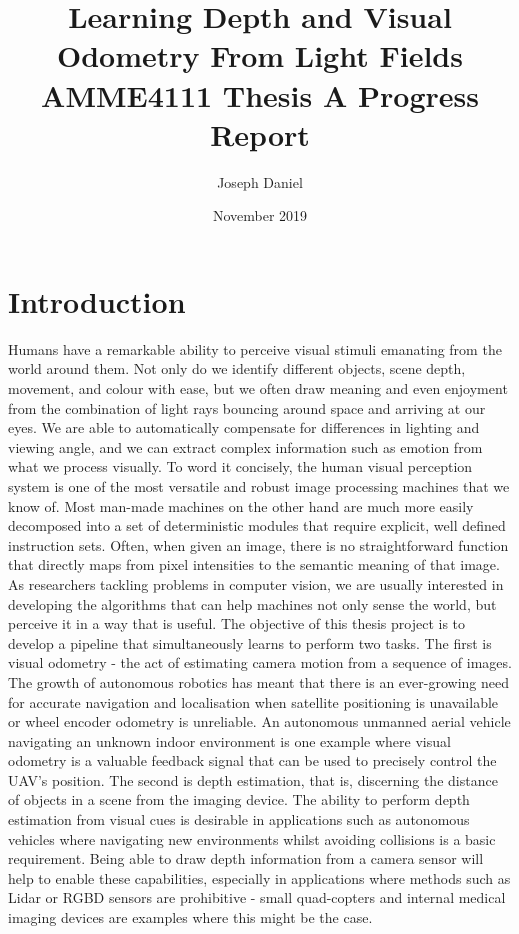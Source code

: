 \documentclass[openany]{book}
\title{Learning Depth and Visual Odometry From Light Fields \\
\large AMME4111 Thesis A Progress Report}
\author{Joseph Daniel}
\date{November 2019}
\begin{document}
\maketitle

\tableofcontents

\chapter{Introduction}
Humans have a remarkable ability to perceive visual stimuli emanating from the world around them. Not only do we identify different objects, scene depth, movement, and colour with ease, but we often draw meaning and even enjoyment from the combination of light rays bouncing around space and arriving at our eyes. We are able to automatically compensate for differences in lighting and viewing angle, and we can extract complex information such as emotion from what we process visually. To word it concisely, the human visual perception system is one of the most versatile and robust image processing machines that we know of. Most man-made machines on the other hand are much more easily decomposed into a set of deterministic modules that require explicit, well defined instruction sets. Often, when given an image, there is no straightforward function that directly maps from pixel intensities to the semantic meaning of that image. As researchers tackling problems in computer vision, we are usually interested in developing the algorithms that can help machines not only sense the world, but perceive it in a way that is useful. The objective of this thesis project is to develop a pipeline that simultaneously learns to perform two tasks. The first is visual odometry - the act of estimating camera motion from a sequence of images. The growth of autonomous robotics has meant that there is an ever-growing need for accurate navigation and localisation when satellite positioning is unavailable or wheel encoder odometry is unreliable. An autonomous unmanned aerial vehicle navigating an unknown indoor environment is one example where visual odometry is a valuable feedback signal that can be used to precisely control the UAV's position. The second is depth estimation, that is, discerning the distance of objects in a scene from the imaging device. The ability to perform depth estimation from visual cues is desirable in applications such as autonomous vehicles where navigating new environments whilst avoiding collisions is a basic requirement. Being able to draw depth information from a camera sensor will help to enable these capabilities, especially in applications where methods such as Lidar or RGBD sensors are prohibitive - small quad-copters and internal medical imaging devices are examples where this might be the case.
\end{document}
